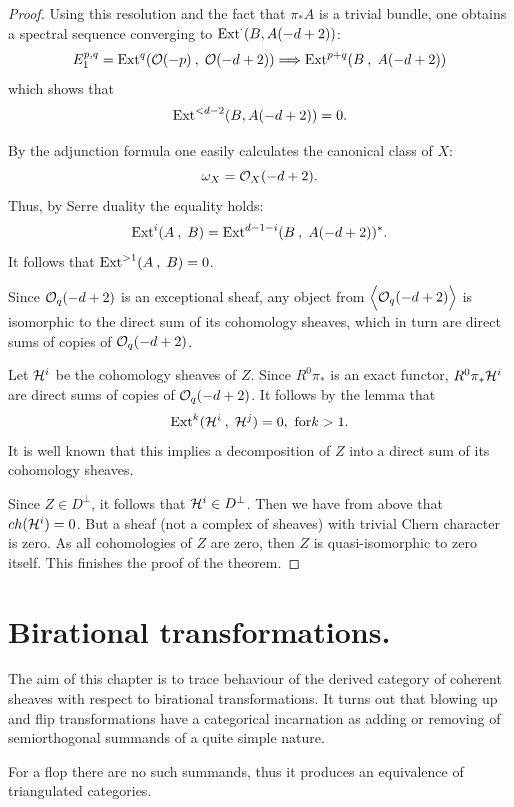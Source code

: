 \documentclass[12pt]{article}
\begin{document}
\begin{proof}
Using this resolution and the fact that $\pi _{*}A$ is a trivial bundle, one obtains a spectral sequence converging to ${\rm Ext}^{\cdot }(B,A(-d+2))$:
$$
E^{p,q}_1= {\rm Ext}^q({\cal O}(-p)\:,\; {\cal O}(-d+2)) \Longrightarrow {\rm Ext}^{p+q}( B\:, \; A(-d+2))
$$
which shows that 
$$
{\rm Ext}^{<d-2}(B,A(-d+2))=0.
$$

By the adjunction formula one easily calculates the canonical class of $X$:
$$
\omega _X= {\cal O}_X(-d+2).
$$
Thus, by Serre duality the equality holds:
$$
{\rm Ext}^{i}( A\:, \; B)={\rm Ext}^{d-1-i}( B\:, \; A(-d+2))^{*}.
$$
It follows that ${\rm Ext}^{>1}( A\:, \; B)=0$.

Since ${\cal O}_q(-d+2)$ is an exceptional sheaf, any object from $\Bigl\langle{\cal O}_q(-d+2)\Bigl\rangle$ is isomorphic to the direct sum of its cohomology sheaves, which in turn are direct sums of copies of ${\cal O}_q(-d+2)$.

Let ${\cal H}^i$ be the cohomology sheaves of $Z$. Since $R^{0}\pi_{*}$ is an exact functor, $R^{0}\pi_{*}{\cal H}^i$
are direct sums of copies of ${\cal O}_q(-d+2)$. It follows by the lemma that
$$
{\rm Ext}^k({\cal H}^i\: ,\;{\cal H}^j)=0,\ {\rm for} k>1.
$$
It is well known that this implies a decomposition of $Z$ into a direct sum of its cohomology sheaves.

Since $Z\in D^{\perp }$, it follows that ${\cal H}^i\in D^{\perp }$. Then we have from above that $ch({\cal H}^i)=0$.
But a sheaf (not a complex of sheaves) with trivial Chern character is zero. As all cohomologies of $Z$ are zero, then $Z$ is quasi-isomorphic to zero itself. This finishes the proof of the theorem.
\end{proof}





\section{Birational transformations.}

The aim of this chapter is to trace behaviour of the derived category of coherent sheaves with respect to birational transformations. It turns out that  blowing up and flip
transformations have a categorical  incarnation as adding or removing of semiorthogonal summands of a quite simple nature.

For a flop there are no such summands, thus it produces an equivalence of triangulated categories.
 
\end{document}
